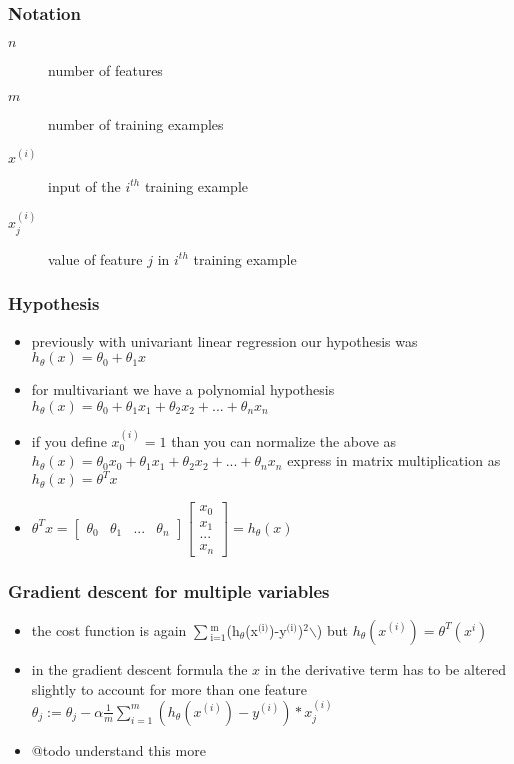 \documentclass[11pt]{article}
\begin{document}
\subsubsection{Notation}
\label{sec:org8607cd0}
\begin{description}
\item[{\(n\)}] number of features
\item[{\(m\)}] number of training examples
\item[{\(x^{(i)}\)}] input of the \(i^{th}\) training example
\item[{\(x_{j}^{(i)}\)}] value of feature \(j\) in \(i^{th}\) training example
\end{description}
\subsubsection{Hypothesis}
\label{sec:org6109f37}
\begin{itemize}
\item previously with univariant linear regression our hypothesis was
\(h_{\theta}(x)=\theta_{0}+\theta_{1}x\)
\item for multivariant we have a polynomial hypothesis \(h_{\theta}(x)=\theta_{0}+\theta_{1}x_{1}+\theta_{2}x_{2}+...+\theta_{n}x_{n}\)
\item if you define \(x_{0}^{(i)} = 1\) than you can normalize the above as
\(h_{\theta}(x)=\theta_{0}x_{0}+\theta_{1}x_{1}+\theta_{2}x_{2}+...+\theta_{n}x_{n}\)
express in matrix multiplication as \(h_{\theta}(x)=\theta^{T}x\)
\item \(\theta^{T}x=\begin{bmatrix}\theta_{0} & \theta_{1} & ... & \theta_{n}\end{bmatrix}\begin{bmatrix}x_{0} \\ x_{1} \\ ... \\ x_{n} \end{bmatrix}=h_{\theta}(x)\)
\end{itemize}
\subsubsection{Gradient descent for multiple variables}
\label{sec:orgbbcedaa}
\begin{itemize}
\item the cost function is again \(\sum\)\limits\(_{\text{i=1}}^{\text{m}}\)(h\(_{\theta}\)(x\(^{\text{(i)}}\))-y\(^{\text{(i)}}\))\(^{\text{2}}\)$\backslash$) but \(h_{\theta}(x^{(i)})=\theta^{T}(x^{i})\)
\item in the gradient descent formula the \(x\) in the derivative term has
to be altered slightly to account for more than one feature
\(\theta_{j}:=\theta_{j}-\alpha\frac{1}{m}\sum\limits_{i=1}^{m}(h_{\theta}(x^{(i)})-y^{(i)})*x_{j}^{(i)}\)
\item @todo understand this more
\end{itemize}
\end{document}
